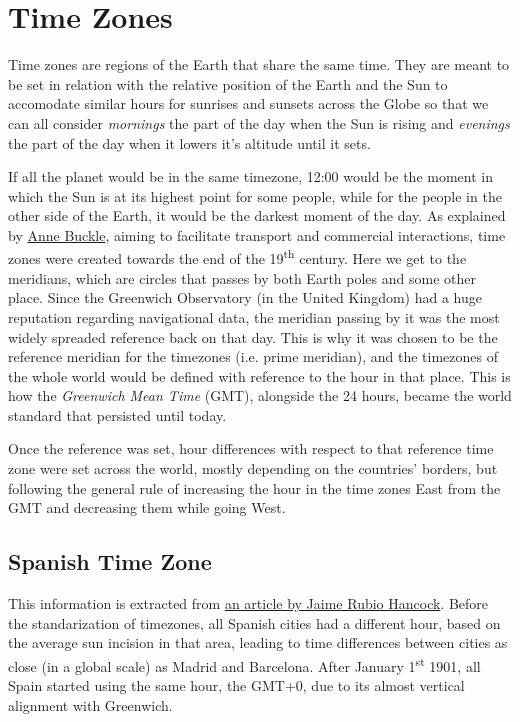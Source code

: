 \documentclass[../my_knowledge.tex]{subfiles}
\begin{document}
\section{Time Zones}
Time zones are regions of the Earth that share the same time. They are meant to be set in relation with the relative position of the Earth and the Sun to accomodate similar hours for sunrises and sunsets across the Globe so that we can all consider \textit{mornings} the part of the day when the Sun is rising and \textit{evenings} the part of the day when it lowers it's altitude until it sets.

If all the planet would be in the same timezone, 12:00 would be the moment in which the Sun is at its highest point for some people, while for the people in the other side of the Earth, it would be the darkest moment of the day. As explained by \href{https://www.timeanddate.com/time/time-zones-history.html}{Anne Buckle}\cite{timezones_origin}, aiming to facilitate transport and commercial interactions, time zones were created towards the end of the 19\textsuperscript{th} century. Here we get to the meridians, which are circles that passes by both Earth poles and some other place. Since the Greenwich Observatory (in the United Kingdom) had a huge reputation regarding navigational data, the meridian passing by it was the most widely spreaded reference back on that day. This is why it was chosen to be the reference meridian for the timezones (i.e. prime meridian), and the timezones of the whole world would be defined with reference to the hour in that place. This is how the \textit{Greenwich Mean Time} (GMT), alongside the 24 hours, became the world standard that persisted until today.

Once the reference was set, hour differences with respect to that reference time zone were set across the world, mostly depending on the countries' borders, but following the general rule of increasing the hour in the time zones East from the GMT and decreasing them while going West.

\subsection{Spanish Time Zone}
This information is extracted from \href{https://verne.elpais.com/verne/2018/09/01/articulo/1535793808_157511.html}{an article by Jaime Rubio Hancock}\cite{spanish_timezone}. Before the standarization of timezones, all Spanish cities had a different hour, based on the average sun incision in that area, leading to time differences between cities as close (in a global scale) as Madrid and Barcelona. After January 1\textsuperscript{st} 1901, all Spain started using the same hour, the GMT+0, due to its almost vertical alignment with Greenwich.
\end{document}
